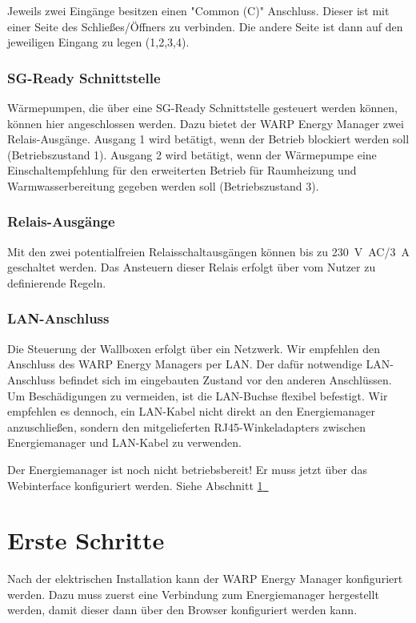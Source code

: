 \documentclass[a4paper,10pt]{article}
\newcommand{\hint}[1]{\begin{tcolorbox}[colback=boxgray,colframe=black,coltext=
white,title=Hinweis,left*=2mm,right*=2mm,boxsep=1mm,bottom=1mm,top=1mm]#1\end{tcolorbox}}
\newcommand*{\fullref}[1]{Abschnitt \hyperref[{#1}]{\ref*{#1}~\nameref*{#1}}}
\begin{document}
\begin{multicols*}{2}
    Jeweils zwei Eingänge besitzen einen "Common (C)" Anschluss. Dieser ist mit einer Seite des Schließes/Öffners
    zu verbinden. Die andere Seite ist dann auf den jeweiligen Eingang zu legen (1,2,3,4).

	\subsubsection{SG-Ready Schnittstelle}
    Wärmepumpen, die über eine SG-Ready Schnittstelle gesteuert werden können, können hier angeschlossen werden.
    Dazu bietet der WARP Energy Manager zwei Relais-Ausgänge. 
    Ausgang 1 wird betätigt, wenn der Betrieb blockiert werden soll (Betriebszustand 1).
    Ausgang 2 wird betätigt, wenn der Wärmepumpe eine Einschaltempfehlung für den erweiterten Betrieb 
    für Raumheizung und Warmwasserbereitung gegeben werden soll (Betriebszustand 3).

	\subsubsection{Relais-Ausgänge}
	Mit den zwei potentialfreien Relaisschaltausgängen können bis zu \SI{230}{\volt AC}/\SI{3}{\ampere} geschaltet
	werden. Das Ansteuern dieser Relais erfolgt über vom Nutzer zu definierende Regeln.

	\subsubsection{LAN-Anschluss}
	Die Steuerung der Wallboxen erfolgt über ein Netzwerk. Wir empfehlen den
	Anschluss des WARP Energy Managers per LAN. Der dafür notwendige LAN-Anschluss
	befindet sich im eingebauten Zustand vor den anderen Anschlüssen. Um Beschädigungen
	zu vermeiden, ist die LAN-Buchse flexibel befestigt. Wir empfehlen es dennoch, ein LAN-Kabel
	nicht direkt an den Energiemanager anzuschließen, sondern den mitgelieferten RJ45-Winkeladapters zwischen Energiemanager und LAN-Kabel zu verwenden.

	\hint{Der Energiemanager ist noch nicht betriebsbereit! Er muss jetzt über das Webinterface konfiguriert werden. Siehe \fullref{setup}}

	\vfill
	\null
	\newpage
	\section{Erste Schritte}
	\label{setup}

	Nach der elektrischen Installation kann der WARP Energy Manager konfiguriert
	werden. Dazu muss zuerst eine Verbindung zum Energiemanager hergestellt werden,
	damit dieser dann über den Browser konfiguriert werden kann.


\end{multicols*}
\end{document}
